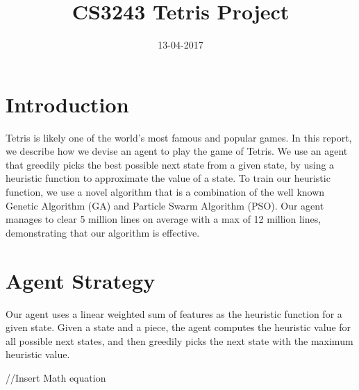 \documentclass{article}
\title{CS3243 Tetris Project}
\date{13-04-2017}
\begin{document}
	\maketitle
	\thispagestyle{empty}
	\vspace{5mm}

    \section{Introduction}
    Tetris is likely one of the world's most famous and popular games.
    In this report, we describe how we devise an agent to play the game of Tetris.
    We use an agent that greedily picks the best possible next state from a given state,
    by using a heuristic function to approximate the value of a state. To train our heuristic
    function, we use a novel algorithm that is a combination of the well known Genetic Algorithm (GA)
    and Particle Swarm Algorithm (PSO). Our agent manages to clear 5 million lines on average with a max
    of 12 million lines, demonstrating that our algorithm is effective.

    \section{Agent Strategy}
    Our agent uses a linear weighted sum of features as the heuristic function for a given state. Given a state and a piece, the agent computes
    the heuristic value for all possible next states, and then greedily picks the next state with
    the maximum heuristic value.

    //Insert Math equation
\end{document}
